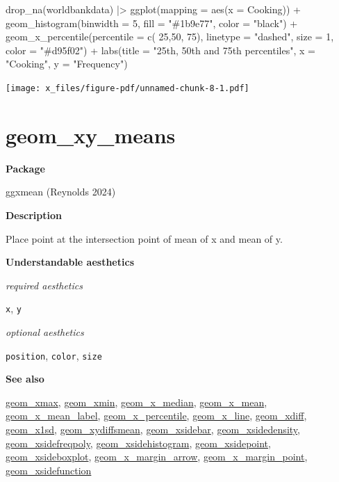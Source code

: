 \documentclass[
  letterpaper,
  DIV=11,
  numbers=noendperiod]{scrreprt}
\newenvironment{Shaded}{\begin{snugshade}}{\end{snugshade}}
\newcommand{\AttributeTok}[1]{\textcolor[rgb]{0.40,0.45,0.13}{#1}}
\newcommand{\DecValTok}[1]{\textcolor[rgb]{0.68,0.00,0.00}{#1}}
\newcommand{\FunctionTok}[1]{\textcolor[rgb]{0.28,0.35,0.67}{#1}}
\newcommand{\NormalTok}[1]{\textcolor[rgb]{0.00,0.23,0.31}{#1}}
\newcommand{\SpecialCharTok}[1]{\textcolor[rgb]{0.37,0.37,0.37}{#1}}
\newcommand{\StringTok}[1]{\textcolor[rgb]{0.13,0.47,0.30}{#1}}
\begin{document}
\begin{Shaded}
\begin{Highlighting}[]
\FunctionTok{drop\_na}\NormalTok{(worldbankdata) }\SpecialCharTok{|\textgreater{}}
\FunctionTok{ggplot}\NormalTok{(}\AttributeTok{mapping =} \FunctionTok{aes}\NormalTok{(}\AttributeTok{x =}\NormalTok{ Cooking)) }\SpecialCharTok{+}
  \FunctionTok{geom\_histogram}\NormalTok{(}\AttributeTok{binwidth =} \DecValTok{5}\NormalTok{, }\AttributeTok{fill =} \StringTok{"\#1b9e77"}\NormalTok{, }\AttributeTok{color =} \StringTok{"black"}\NormalTok{) }\SpecialCharTok{+} 
  \FunctionTok{geom\_x\_percentile}\NormalTok{(}\AttributeTok{percentile =} \FunctionTok{c}\NormalTok{( }\DecValTok{25}\NormalTok{,}\DecValTok{50}\NormalTok{, }\DecValTok{75}\NormalTok{), }\AttributeTok{linetype =} \StringTok{"dashed"}\NormalTok{, }\AttributeTok{size =} \DecValTok{1}\NormalTok{, }\AttributeTok{color =} \StringTok{"\#d95f02"}\NormalTok{) }\SpecialCharTok{+}
     \FunctionTok{labs}\NormalTok{(}\AttributeTok{title =} \StringTok{"25th, 50th and 75th percentiles"}\NormalTok{, }\AttributeTok{x =} \StringTok{"Cooking"}\NormalTok{, }\AttributeTok{y =} \StringTok{"Frequency"}\NormalTok{)}
\end{Highlighting}
\end{Shaded}

\texttt{[image: x\_files/figure-pdf/unnamed-chunk-8-1.pdf]}

\section{geom\_xy\_means}\label{xy_means}

\textbf{Package}

ggxmean (Reynolds 2024)

\textbf{Description}

Place point at the intersection point of mean of x and mean of y.

\textbf{Understandable aesthetics}

\emph{required aesthetics}

\texttt{x}, \texttt{y}

\emph{optional aesthetics}

\texttt{position}, \texttt{color}, \texttt{size}

\textbf{See also}

\href{@xmax}{geom\_xmax}, \href{@xmin}{geom\_xmin},
\href{@x_median}{geom\_x\_median}, \href{@x_mean}{geom\_x\_mean},
\href{@x_mean_label}{geom\_x\_mean\_label},
\href{@x_percentile}{geom\_x\_percentile},
\href{@x_line}{geom\_x\_line}, \href{@xdiff}{geom\_xdiff},
\href{@x1sd}{geom\_x1sd}, \href{@xydiffsmean}{geom\_xydiffsmean},
\href{@xsidebar}{geom\_xsidebar},
\href{@xsidedensity}{geom\_xsidedensity},
\href{@xsidefreqpoly}{geom\_xsidefreqpoly},
\href{@xsidehistogram}{geom\_xsidehistogram},
\href{@xsidepoint}{geom\_xsidepoint},
\href{@xsideboxplot}{geom\_xsideboxplot},
\href{@x_margin_arrow}{geom\_x\_margin\_arrow},
\href{@x_margin_point}{geom\_x\_margin\_point},
\href{@xsidefunction}{geom\_xsidefunction}
\end{document}
